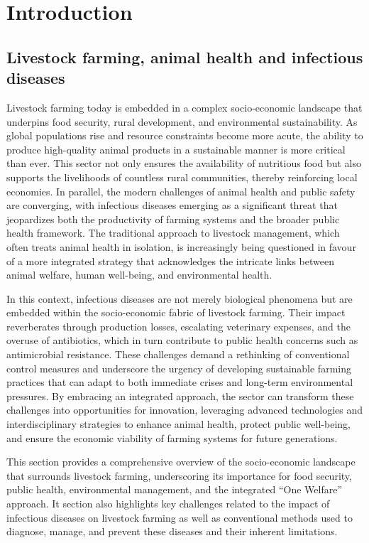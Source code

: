 \chapter{Introduction} 

\section{Livestock farming, animal health and infectious diseases}

Livestock farming today is embedded in a complex socio-economic landscape that underpins food security, rural development, and environmental sustainability. As global populations rise and resource constraints become more acute, the ability to produce high-quality animal products in a sustainable manner is more critical than ever. This sector not only ensures the availability of nutritious food but also supports the livelihoods of countless rural communities, thereby reinforcing local economies. In parallel, the modern challenges of animal health and public safety are converging, with infectious diseases emerging as a significant threat that jeopardizes both the productivity of farming systems and the broader public health framework. The traditional approach to livestock management, which often treats animal health in isolation, is increasingly being questioned in favour of a more integrated strategy that acknowledges the intricate links between animal welfare, human well-being, and environmental health.

In this context, infectious diseases are not merely biological phenomena but are embedded within the socio-economic fabric of livestock farming. Their impact reverberates through production losses, escalating veterinary expenses, and the overuse of antibiotics, which in turn contribute to public health concerns such as antimicrobial resistance. These challenges demand a rethinking of conventional control measures and underscore the urgency of developing sustainable farming practices that can adapt to both immediate crises and long-term environmental pressures. By embracing an integrated approach, the sector can transform these challenges into opportunities for innovation, leveraging advanced technologies and interdisciplinary strategies to enhance animal health, protect public well-being, and ensure the economic viability of farming systems for future generations.

This section provides a comprehensive overview of the socio-economic landscape that surrounds livestock farming, underscoring its importance for food security, public health, environmental management, and the integrated “One Welfare” approach. It section also highlights key challenges related to the impact of infectious diseases on livestock farming as well as conventional methods used to diagnose, manage, and prevent these diseases and their inherent limitations.

